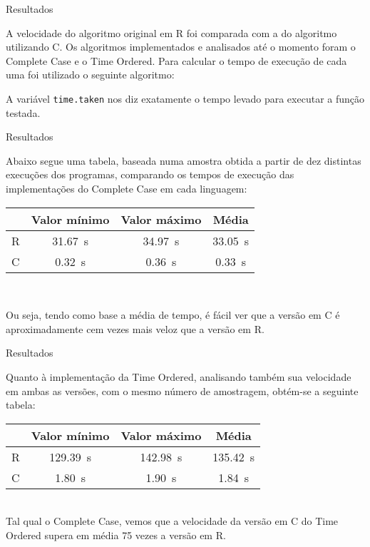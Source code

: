 \documentclass{beamer}
\begin{document}
\begin{frame}{Resultados}

A velocidade do algoritmo original em R foi comparada com a do algoritmo utilizando C. Os algoritmos implementados e analisados até o momento foram o Complete Case e o Time Ordered. Para calcular o tempo de execução de cada uma foi utilizado o seguinte algoritmo:



A variável \texttt{time.taken} nos diz exatamente o tempo levado para executar a função testada.
    
\end{frame}

\begin{frame}{Resultados}
    
Abaixo segue uma tabela, baseada numa amostra obtida a partir de dez distintas execuções dos programas, comparando os tempos de execução das implementações do Complete Case em cada linguagem:\\
\vspace{0.3cm}

\begin{tabular}{|c|c|c|c|}
     \hline
      & Valor mínimo & Valor máximo & Média\\
      \hline
      R & \SI{31.67}{\second} & \SI{34.97}{\second} & \SI{33.05}{\second}\\
      \hline
      C & \SI{0.32}{\second} & \SI{0.36}{\second} & \SI{0.33}{\second}\\
      \hline
\end{tabular}\\
\vspace{0.3cm}

Ou seja, tendo como base a média de tempo, é fácil ver que a versão em C é aproximadamente cem vezes mais veloz que a versão em R.
    
\end{frame}

\begin{frame}{Resultados}
    
Quanto à implementação da Time Ordered, analisando também sua velocidade em ambas as versões, com o mesmo número de amostragem, obtém-se a seguinte tabela:\\

\vspace{0.3cm}
\begin{tabular}{|c|c|c|c|}
     \hline
      & Valor mínimo & Valor máximo & Média\\
      \hline
      R & \SI{129.39}{\second} & \SI{142.98}{\second} & \SI{135.42}{\second}\\
      \hline
      C & \SI{1.80}{\second} & \SI{1.90}{\second} & \SI{1.84}{\second}\\
      \hline
\end{tabular}\\
\vspace{0.3cm}
Tal qual o Complete Case, vemos que a velocidade da versão em C do Time Ordered supera em média 75 vezes a versão em R.
    
\end{frame}
\end{document}
